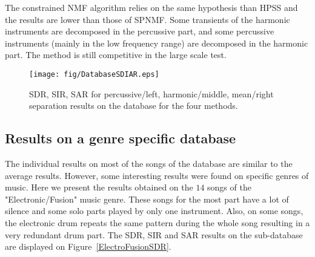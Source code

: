 The constrained NMF algorithm relies on the same hypothesis than HPSS and the results are lower than those of SPNMF. Some transients of the harmonic instruments are decomposed in the percussive part, and some percussive instruments (mainly in the low frequency range) are decomposed in the harmonic part. The method is still competitive in the large scale test. 



\begin{figure*}[t]

  \centering 
  \texttt{[image: fig/DatabaseSDIAR.eps]}
  \caption{\label{DatabaseSDR} SDR, SIR, SAR for percussive/left, harmonic/middle, mean/right separation results on the database for the four methods.}
  
\end{figure*}

%
%  
%
%
%  




\subsection{Results on a genre specific database}
\label{sec:subdata}

The individual results on most of the songs of the database are similar to the average results. However, some interesting results were found on specific genres of music. Here we present the results obtained on the $14$ songs of the "Electronic/Fusion" music genre. These songs for the most part have a lot of silence and some solo parts played by only one instrument. Also, on some songs, the electronic drum repeats the same pattern during the whole song resulting in a very redundant drum part. The SDR, SIR and SAR results on the sub-database are displayed on Figure~\ref{ElectroFusionSDR}. 

